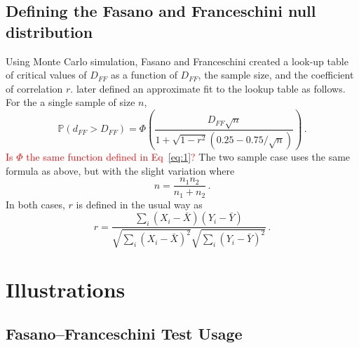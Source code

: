 \documentclass[codesnippet]{jss}
\newcommand{\RBnote}[1]{\textcolor{red}{#1}}
\begin{document}
\subsection{Defining the Fasano and Franceschini null distribution}

Using Monte Carlo simulation, Fasano and Franceschini created a
look-up table of critical values of $D_{FF}$ as a function of
$D_{FF}$, the sample size, and the coefficient of correlation $r$.
\cite{numericalRecipes} later defined an approximate fit to the lookup table
as follows. 
%
For the a single sample of size $n$,
\begin{equation} \label{eq:4}
\mathbb{P}(d_{FF} > D_{FF}) = \Phi \left( \frac{D_{FF}\sqrt{n}}{1+\sqrt{1-r^2}(0.25-0.75/\sqrt{n})} \right) \, .
\end{equation}
\RBnote{Is $\Phi$ the same function defined in Eq~\ref{eq:1}?}
The two sample case uses the same formula as above, but with the slight variation where
\begin{equation} \label{eq:5}
n = \frac{n_1n_2}{n_1+n_2}\, .
\end{equation}
In both cases, $r$ is defined in the usual way as
\begin{equation} \label{eq:6}
r = \frac{\sum_{i}(X_i-\bar{X})(Y_i-\bar{Y})}{\sqrt{\sum_{i}(X_i-\bar{X})^2}\sqrt{\sum_{i}(Y_i-\bar{Y})^2}}\, .
\end{equation}


\section{Illustrations} \label{sec:illustrations}

\subsection{Fasano--Franceschini Test Usage}
\end{document}
